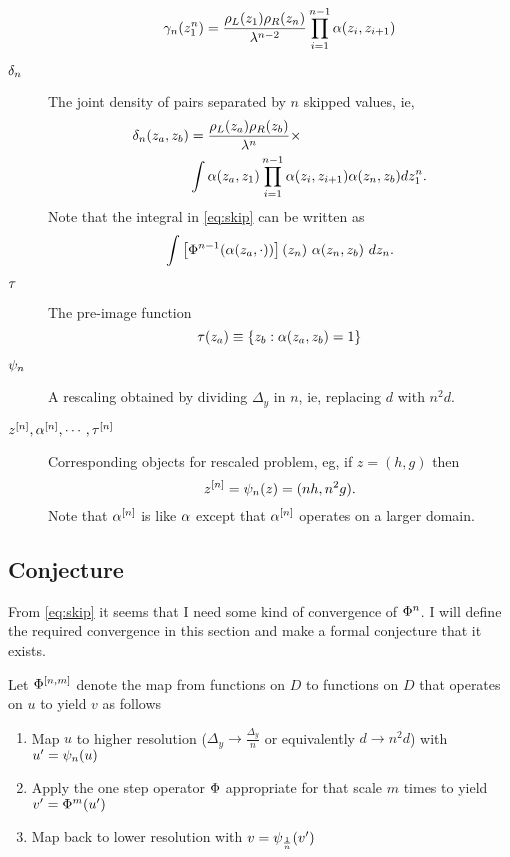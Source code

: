 \documentclass[twocolumn]{article}
\newcommand{\set}[1]{\left\{ #1 \right\}}
\begin{document}
\begin{description}
\begin{equation}
    \label{eq:ptuple}
    \gamma_{n}(z_{1}^{n}) = \frac{\rho_L(z_1)
      \rho_R(z_n)}{\lambda^{n-2}} \prod_{i=1}^{n-1} \alpha(z_i,z_{i+1})
  \end{equation}
\item[$\delta_{n}$] The joint density of pairs separated by $n$ skipped
  values, ie,
  \begin{align}
    \delta_{n}(z_a,z_b) &= \frac{\rho_L(z_a) \rho_R(z_b)}{\lambda^n}
                        \times \nonumber \\
    \label{eq:skip}
                      & \int \alpha(z_a,z_1) \prod_{i=1}^{n-1}
                        \alpha(z_i,z_{i+1}) \alpha(z_n,z_b) d
                        z_{1}^{n}.
  \end{align}
  Note that the integral in \eqref{eq:skip} can be written as
  \begin{equation*}
    \int \left[ \Phi^{n-1}(\alpha(z_a,\cdot)) \right] (z_n)~
    \alpha(z_n,z_b)~ dz_n.
  \end{equation*}
\item[$\tau$] The pre-image function
  \begin{equation*}
    \preimage(z_a) \equiv \set{z_b: \allowed(z_a,z_b) = 1}
  \end{equation*}
\item[$\psi_{n}$] A rescaling obtained by dividing $\Delta_y$ in $n$,
  ie, replacing $d$ with $n^2d$.
\item[$z^{[n]}, \alpha^{[n]},\cdots, \tau^{[n]}$] Corresponding objects for
  rescaled problem, eg, if $z=(h,g)$ then
  \begin{equation*}
    z^{[n]} = \psi_{n}(z) = (nh, n^2g).
  \end{equation*}
  Note that $\alpha^{[n]}$ is like $\alpha$ except that
  $\alpha^{[n]}$ operates on a larger domain.
\end{description}

\subsection{Conjecture}
\label{sec:conjecture}

From \eqref{eq:skip} it seems that I need some kind of convergence of
$\Phi^n$.  I will define the required convergence in this section and
make a formal conjecture that it exists.

Let $\Phi^{[n,m]}$ denote the map from functions on $D$ to
functions on $D$ that operates on $u$ to yield $v$ as follows
\begin{enumerate}
\item Map $u$ to higher resolution ($\Delta_y \rightarrow
\frac{\Delta_y}{n}$ or equivalently $d \rightarrow n^2 d$) with
$u' = \psi_{n}(u)$
\item Apply the one step operator $\Phi$ appropriate for that scale
  $m$ times to yield $v' = \Phi^m(u')$
\item Map back to lower resolution with $v = \psi_{\frac{1}{n}}(v')$
\end{enumerate}
\end{document}
